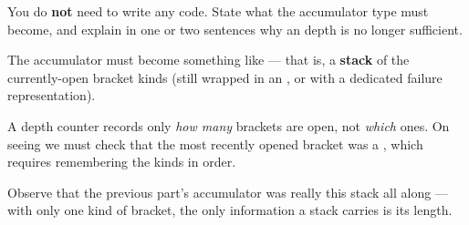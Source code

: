 \begin{parts}
    You do \textbf{not} need to write any code. State what the accumulator type
    must become, and explain in one or two sentences why an  depth is
    no longer sufficient.

    \begin{solutionorbox}[14em]
      The accumulator must become something like  ---
      that is, a \textbf{stack} of the currently-open bracket kinds (still
      wrapped in an , or with a dedicated failure representation).

      A depth counter records only \textit{how many} brackets are open, not
      \textit{which} ones. On seeing  we must check that the
      most recently opened bracket was a , which requires
      remembering the kinds in order.

      Observe that the previous part's  accumulator was really this
      stack all along --- with only one kind of bracket, the only information
      a stack carries is its length.
    \end{solutionorbox}
\end{parts}
